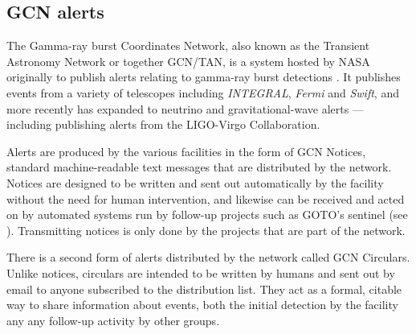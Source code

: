 \subsection{GCN alerts}
\label{sec:gcn}
\begin{colsection}

The Gamma-ray burst Coordinates Network, also known as the Transient Astronomy Network or together GCN/TAN, is a system hosted by NASA originally to publish alerts relating to gamma-ray burst detections \citep{GCN}. It publishes events from a variety of telescopes including \textit{INTEGRAL}, \textit{Fermi} and \textit{Swift}, and more recently has expanded to neutrino and gravitational-wave alerts --- including publishing alerts from the LIGO-Virgo Collaboration.

Alerts are produced by the various facilities in the form of GCN Notices, standard machine-readable text messages that are distributed by the network. Notices are designed to be written and sent out automatically by the facility without the need for human intervention, and likewise can be received and acted on by automated systems run by follow-up projects such as GOTO's sentinel (see ). Transmitting notices is only done by the projects that are part of the network.

There is a second form of alerts distributed by the network called GCN Circulars. Unlike notices, circulars are intended to be written by humans and sent out by email to anyone subscribed to the distribution list. They act as a formal, citable way to share information about events, both the initial detection by the facility any any follow-up activity by other groups.

\end{colsection}


